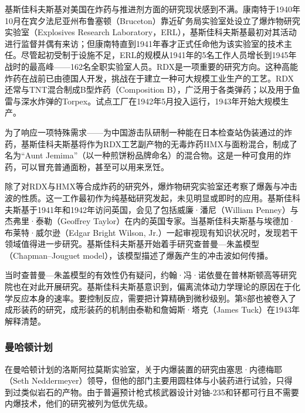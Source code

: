 基斯佳科夫斯基对美国在炸药与推进剂方面的研究现状感到不满。康南特于1940年10月在宾夕法尼亚州布鲁塞顿（Bruceton）靠近矿务局实验室处设立了爆炸物研究实验室（Explosives Research Laboratory，ERL），基斯佳科夫斯基最初对其活动进行监督并偶有来访；但康南特直到1941年春才正式任命他为该实验室的技术主任。尽管起初受制于设施不足，ERL的规模从1941年的5名工作人员增长到1945年战时的最高峰——162名全职实验室人员。RDX是一项重要的研究方向。这种高能炸药在战前已由德国人开发，挑战在于建立一种可大规模工业生产的工艺。RDX还常与TNT混合制成B型炸药（Composition B），广泛用于各类弹药；以及用于鱼雷与深水炸弹的Torpex。试点工厂在1942年5月投入运行，1943年开始大规模生产。

为了响应一项特殊需求——为中国游击队研制一种能在日本检查站伪装通过的炸药，基斯佳科夫斯基将作为RDX工艺副产物的无毒炸药HMX与面粉混合，制成了名为“Aunt Jemima”（以一种煎饼粉品牌命名）的混合物。这是一种可食用的炸药，可以冒充普通面粉，甚至可以用来烹饪。

除了对RDX与HMX等合成炸药的研究外，爆炸物研究实验室还考察了爆轰与冲击波的性质。这一工作最初作为纯基础研究发起，未见明显或即时的应用。基斯佳科夫斯基于1941年和1942年访问英国，会见了包括威廉·潘尼（William Penney）与杰弗里·泰勒（Geoffrey Taylor）在内的英国专家。当基斯佳科夫斯基与埃德加·布莱特·威尔逊（Edgar Bright Wilson, Jr.）一起审视现有知识状况时，发现若干领域值得进一步研究。基斯佳科夫斯基开始着手研究查普曼—朱盖模型（Chapman–Jouguet model），该模型描述了爆轰产生的冲击波如何传播。

当时查普曼—朱盖模型的有效性仍有疑问，约翰·冯·诺依曼在普林斯顿高等研究院也在对此开展研究。基斯佳科夫斯基意识到，偏离流体动力学理论的原因在于化学反应本身的速率。要控制反应，需要把计算精确到微秒级别。第8部也被卷入了成形装药的研究，成形装药的机制由泰勒和詹姆斯·塔克（James Tuck）在1943年解释清楚。
\subsubsection{曼哈顿计划}
在曼哈顿计划的洛斯阿拉莫斯实验室，关于内爆装置的研究由塞思·内德梅耶（Seth Neddermeyer）领导，但他的部门主要用圆柱体与小装药进行试验，只得到过类似岩石的产物。由于普遍预计枪式核武器设计对铀-235和钚都可行且不需要内爆技术，他们的研究被列为低优先级。

